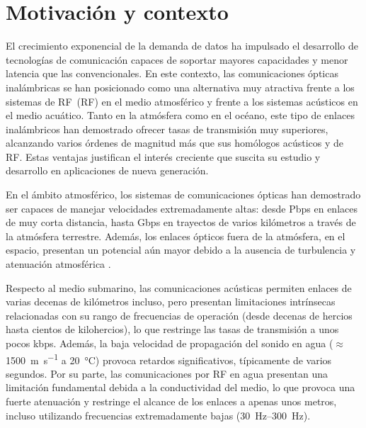 
\minitoc

\section{Motivación y contexto}\label{sec:intro:obj}
El crecimiento exponencial de la demanda de datos ha impulsado el desarrollo de tecnologías de comunicación capaces de soportar mayores capacidades y menor latencia que las convencionales. En este contexto, las comunicaciones ópticas inalámbricas se han posicionado como una alternativa muy atractiva frente a los sistemas de \acs{RF}~(\acl{RF}) en el medio atmosférico y frente a los sistemas acústicos en el medio acuático. Tanto en la atmósfera como en el océano, este tipo de enlaces inalámbricos han demostrado ofrecer tasas de transmisión muy superiores, alcanzando varios órdenes de magnitud más que sus homólogos acústicos y de RF. Estas ventajas justifican el interés creciente que suscita su estudio y desarrollo en aplicaciones de nueva generación.

En el ámbito atmosférico, los sistemas de comunicaciones ópticas han demostrado ser capaces de manejar velocidades extremadamente altas: desde Pbps en enlaces de muy corta distancia, hasta Gbps en trayectos de varios kilómetros a través de la atmósfera terrestre. Además, los enlaces ópticos fuera de la atmósfera, en el espacio, presentan un potencial aún mayor debido a la ausencia de turbulencia y atenuación atmosférica \cite{Trichili}.

Respecto al medio submarino, las comunicaciones acústicas permiten enlaces de varias decenas de kilómetros incluso, pero presentan limitaciones intrínsecas relacionadas con su rango de frecuencias de operación (desde decenas de hercios hasta cientos de kilohercios), lo que restringe las tasas de transmisión a unos pocos kbps\cite{Zeng}. Además, la baja velocidad de propagación del sonido en agua ($\approx$ \SI{1500}{\metre\per\second} a \SI{20}{\celsius}) provoca retardos significativos, típicamente de varios segundos\cite{Zeng}. Por su parte, las comunicaciones por RF en agua presentan una limitación fundamental debida a la conductividad del medio, lo que provoca una fuerte atenuación y restringe el alcance de los enlaces a apenas unos metros, incluso utilizando frecuencias extremadamente bajas (\SIrange{30}{300}{\hertz})\cite{Zeng}.

